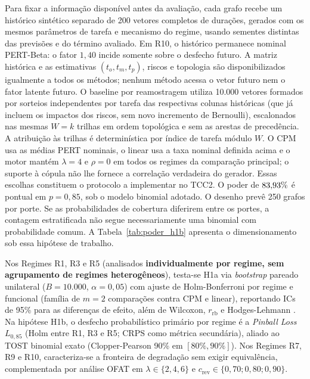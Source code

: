 \documentclass[12pt,openany,oneside,a4paper,english,brazilian,sumario=tradicional]{abntex2}
\begin{document}
Para fixar a informação disponível antes da avaliação, cada grafo recebe um histórico sintético separado de 200 vetores completos de durações, gerados com os mesmos parâmetros de tarefa e mecanismo do regime, usando sementes distintas das previsões e do término avaliado. Em R10, o histórico permanece nominal PERT-Beta: o fator $1{,}40$ incide somente sobre o desfecho futuro. A matriz histórica e as estimativas $(t_o,t_m,t_p)$, riscos e topologia são disponibilizados igualmente a todos os métodos; nenhum método acessa o vetor futuro nem o fator latente futuro. O baseline por reamostragem utiliza 10.000 vetores formados por sorteios independentes por tarefa das respectivas colunas históricas (que já incluem os impactos dos riscos, sem novo incremento de Bernoulli), escalonados nas mesmas $W=k$ trilhas em ordem topológica e sem as arestas de precedência. A atribuição às trilhas é determinística por índice de tarefa módulo $W$. O CPM usa as médias PERT nominais, o linear usa a taxa nominal definida acima e o motor mantém $\lambda=4$ e $\rho=0$ em todos os regimes da comparação principal; o suporte à cópula não lhe fornece a correlação verdadeira do gerador. Essas escolhas constituem o protocolo a implementar no TCC2. O poder de $83{,}93{}\%$ é pontual em $p=0{,}85$, sob o modelo binomial adotado. O desenho prevê 250 grafos por porte. Se as probabilidades de cobertura diferirem entre os portes, a contagem estratificada não segue necessariamente uma binomial com probabilidade comum. A Tabela~\ref{tab:poder_h1b} apresenta o dimensionamento sob essa hipótese de trabalho.

Nos Regimes R1, R3 e R5 (analisados \textbf{individualmente por regime, sem agrupamento de regimes heterogêneos}), testa-se H1a via \textit{bootstrap} pareado unilateral ($B=10.000$, $\alpha=0{,}05$) com ajuste de Holm-Bonferroni \cite{holm1979} por regime e funcional (família de $m=2$ comparações contra CPM e linear), reportando ICs de 95\% para as diferenças de efeito, além de Wilcoxon, $r_{\mathrm{rb}}$ e Hodges-Lehmann \cite{hodges1963}. Na hipótese H1b, o desfecho probabilístico primário por regime é a \textit{Pinball Loss} $L_{0{,}85}$ (Holm entre R1, R3 e R5; $\mathrm{CRPS}$ como métrica secundária), aliado ao TOST binomial exato (Clopper-Pearson 90\% em $[80\%,90\%]$). Nos Regimes R7, R9 e R10, caracteriza-se a fronteira de degradação sem exigir equivalência, complementada por análise OFAT em $\lambda \in \{2, 4, 6\}$ e $c_{\mathrm{rev}} \in \{0{,}70; 0{,}80; 0{,}90\}$.
\end{document}
